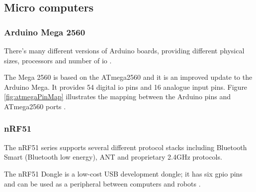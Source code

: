 \subsection{Micro computers}
\subsubsection{Arduino Mega 2560}
There's many different versions of Arduino boards, providing different physical sizes, processors and number of \acrfull{io} \cite{arduinoboards}. 

The Mega 2560 is based on the ATmega2560 and it is an improved update to the Arduino Mega. It provides 54 digital \acrshort{io} pins and 16 analogue input pins. Figure \ref{fig:atmegaPinMap} illustrates the mapping between the Arduino pins and ATmega2560 ports \cite{arduinomega2560}. 


\subsubsection{nRF51}
The nRF51 series supports several different protocol stacks including Bluetooth Smart (Bluetooth low energy), ANT and proprietary 2.4GHz protocols. 

The nRF51 Dongle is a low-cost USB development dongle; it has six \acrfull{gpio} pins and can be used as a peripheral between computers and robots \cite{nrf51Dongle}.


